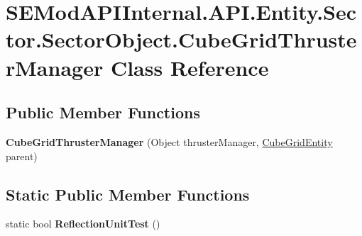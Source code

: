 \hypertarget{class_s_e_mod_a_p_i_internal_1_1_a_p_i_1_1_entity_1_1_sector_1_1_sector_object_1_1_cube_grid_thruster_manager}{}\section{S\+E\+Mod\+A\+P\+I\+Internal.\+A\+P\+I.\+Entity.\+Sector.\+Sector\+Object.\+Cube\+Grid\+Thruster\+Manager Class Reference}
\label{class_s_e_mod_a_p_i_internal_1_1_a_p_i_1_1_entity_1_1_sector_1_1_sector_object_1_1_cube_grid_thruster_manager}
\subsection*{Public Member Functions}
\begin{DoxyCompactItemize}
\item 
\hypertarget{class_s_e_mod_a_p_i_internal_1_1_a_p_i_1_1_entity_1_1_sector_1_1_sector_object_1_1_cube_grid_thruster_manager_a39ba165865c0542d1782f3fc6d1a216c}{}{\bfseries Cube\+Grid\+Thruster\+Manager} (Object thruster\+Manager, \hyperlink{class_s_e_mod_a_p_i_internal_1_1_a_p_i_1_1_entity_1_1_sector_1_1_sector_object_1_1_cube_grid_entity}{Cube\+Grid\+Entity} parent)\label{class_s_e_mod_a_p_i_internal_1_1_a_p_i_1_1_entity_1_1_sector_1_1_sector_object_1_1_cube_grid_thruster_manager_a39ba165865c0542d1782f3fc6d1a216c}

\end{DoxyCompactItemize}
\subsection*{Static Public Member Functions}
\begin{DoxyCompactItemize}
\item 
\hypertarget{class_s_e_mod_a_p_i_internal_1_1_a_p_i_1_1_entity_1_1_sector_1_1_sector_object_1_1_cube_grid_thruster_manager_a9616bb8a3c3ae38c7dcf733e57bf1df5}{}static bool {\bfseries Reflection\+Unit\+Test} ()\label{class_s_e_mod_a_p_i_internal_1_1_a_p_i_1_1_entity_1_1_sector_1_1_sector_object_1_1_cube_grid_thruster_manager_a9616bb8a3c3ae38c7dcf733e57bf1df5}

\end{DoxyCompactItemize}
